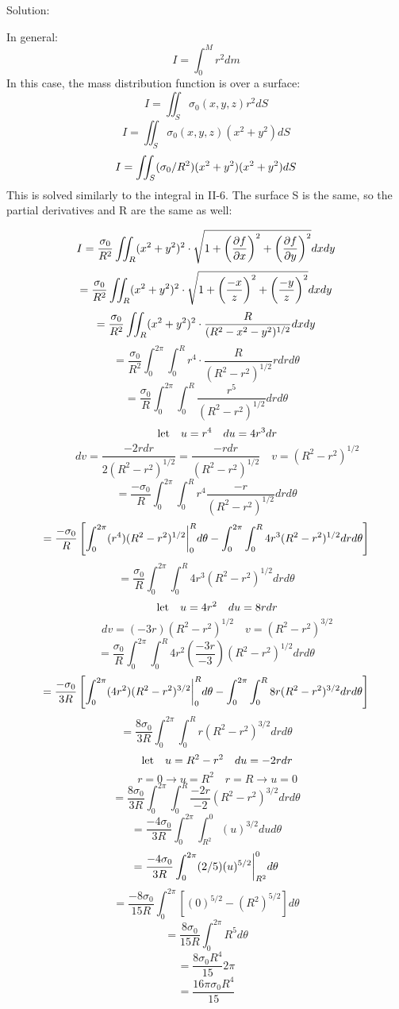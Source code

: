 \documentclass{article}
\begin{document}
\begin{enumerate}
    Solution:

    In general:
    \[ I = \int_0^M r^2 dm \]
    In this case, the mass distribution function is over a surface:
    \[ I = \iint_S \sigma_0(x,y,z)r^2 dS \]
    \[ I = \iint_S \sigma_0(x,y,z)(x^2 + y^2) dS \]
    \[ I = \iint_S (\sigma_0/R^2)(x^2 + y^2)(x^2 + y^2) dS \]
    This is solved similarly to the integral in II-6. The surface S is the same,
    so the partial derivatives and R are the same as well:

    \[ I = \frac{\sigma_0}{R^2} \iint_R (x^2 + y^2)^2 \cdot \sqrt{1 + \left(\frac{\partial{f}}{\partial{x}}\right)^2 + \left(\frac{\partial{f}}{\partial{y}}\right)^2 } dxdy \]
    \[ = \frac{\sigma_0}{R^2} \iint_R (x^2 + y^2)^2 \cdot \sqrt{1 + \left(\frac{-x}{z}\right)^2 + \left(\frac{-y}{z}\right)^2 } dxdy \]
    \[ = \frac{\sigma_0}{R^2} \iint_R (x^2 + y^2)^2 \cdot \frac{R}{(R^2 - x^2 - y^2)^{1/2}} dxdy \]
    \[ = \frac{\sigma_0}{R^2} \int_0^{2\pi} \int_0^R r^4 \cdot \frac{R}{(R^2 - r^2)^{1/2}} rdr d\theta \]
    \[ = \frac{\sigma_0}{R} \int_0^{2\pi} \int_0^R \frac{r^5}{(R^2 - r^2)^{1/2}} dr d\theta \]
    \[  \qquad \textnormal{let} \quad u = r^4 \quad du = 4r^3dr \]
    \[  \qquad dv = \frac{-2rdr}{2(R^2 - r^2)^{1/2}} = \frac{-rdr}{(R^2 - r^2)^{1/2}} \quad v = (R^2 - r^2)^{1/2} \]
    \[ = \frac{-\sigma_0}{R} \int_0^{2\pi} \int_0^R {r^4}\frac{-r}{(R^2 - r^2)^{1/2}} dr d\theta \]
    \[ = \frac{-\sigma_0}{R} \left[ \int_0^{2\pi} (r^4)(R^2-r^2)^{1/2} \bigg{|}_0^R d\theta - \int_0^{2\pi} \int_0^R {4r^3}(R^2 - r^2)^{1/2} dr d\theta \right] \]
    \[ = \frac{\sigma_0}{R} \int_0^{2\pi} \int_0^R {4r^3}(R^2 - r^2)^{1/2} dr d\theta \]
    \[  \qquad \textnormal{let} \quad u = 4r^2 \quad du = 8rdr \]
    \[  \qquad dv = (-3r)(R^2 - r^2)^{1/2} \quad v = (R^2 - r^2)^{3/2} \]
    \[ = \frac{\sigma_0}{R} \int_0^{2\pi} \int_0^R {4r^2} \left( \frac{-3r}{-3} \right) (R^2 - r^2)^{1/2} dr d\theta \]
    \[ = \frac{-\sigma_0}{3R} \left[ \int_0^{2\pi} (4r^2)(R^2 - r^2)^{3/2} \bigg{|}_0^R d\theta - \int_0^{2\pi} \int_0^R 8r(R^2 - r^2)^{3/2} dr d\theta \right] \]
    \[ = \frac{8\sigma_0}{3R} \int_0^{2\pi} \int_0^R r(R^2 - r^2)^{3/2} dr d\theta \]
    \[  \qquad \textnormal{let} \quad u = R^2 - r^2 \quad du = -2rdr \]
    \[  \qquad r=0 \rightarrow u=R^2 \quad r=R \rightarrow u=0 \]
    \[ = \frac{8\sigma_0}{3R} \int_0^{2\pi} \int_0^R \frac{-2r}{-2}(R^2 - r^2)^{3/2} dr d\theta \]
    \[ = \frac{-4\sigma_0}{3R} \int_0^{2\pi} \int_{R^2}^0 (u)^{3/2} du d\theta \]
    \[ = \frac{-4\sigma_0}{3R} \int_0^{2\pi} (2/5)(u)^{5/2} \bigg{|}_{R^2}^0 d\theta \]
    \[ = \frac{-8\sigma_0}{15R} \int_0^{2\pi} \left[ (0)^{5/2} - (R^2)^{5/2} \right] d\theta \]
    \[ = \frac{8\sigma_0}{15R} \int_0^{2\pi} R^5 d\theta \]
    \[ = \frac{8\sigma_0 R^4}{15} 2 \pi \]
    \[ = \frac{16\pi \sigma_0 R^4}{15} \]


\end{enumerate}
\end{document}
